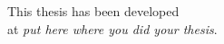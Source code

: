 \vspace{17cm}

\begin{center}
This thesis has been developed\\
at \emph{put here where you did your thesis}.%
\end{center}
